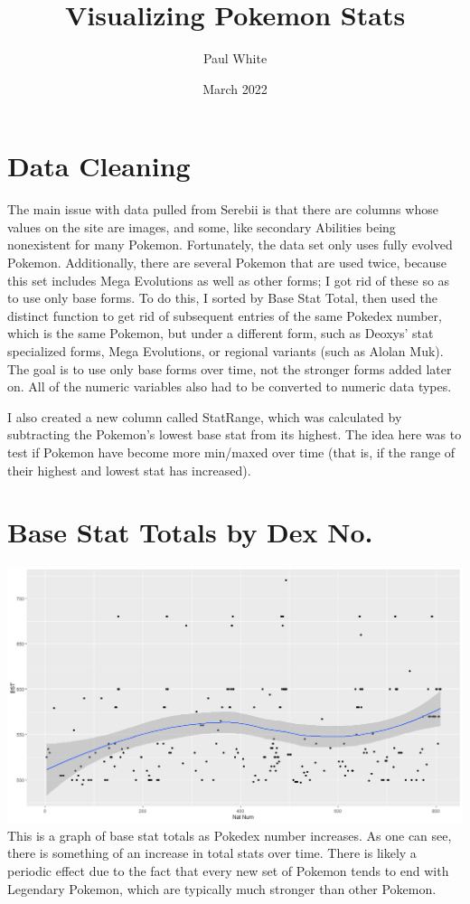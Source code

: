 \documentclass{article}
\title{Visualizing Pokemon Stats}
\author{Paul White}
\date{March 2022}
\begin{document}
\maketitle

\section{Data Cleaning}
The main issue with data pulled from Serebii is that there are columns whose values on the site are images, and some, like secondary Abilities being nonexistent for many Pokemon. Fortunately, the data set only uses fully evolved Pokemon. Additionally, there are several Pokemon that are used twice, because this set includes Mega Evolutions as well as other forms; I got rid of these so as to use only base forms. To do this, I sorted by Base Stat Total, then used the distinct function to get rid of subsequent entries of the same Pokedex number, which is the same Pokemon, but under a different form, such as Deoxys' stat specialized forms, Mega Evolutions, or regional variants (such as Alolan Muk). The goal is to use only base forms over time, not the stronger forms added later on. All of the numeric variables also had to be converted to numeric data types.

I also created a new column called StatRange, which was calculated by subtracting the Pokemon's lowest base stat from its highest. The idea here was to test if Pokemon have become more min/maxed over time (that is, if the range of their highest and lowest stat has increased).

\section{Base Stat Totals by Dex No.}

\includegraphics[scale = .4]{PS6a_White.png}
This is a graph of base stat totals as Pokedex number increases. As one can see, there is something of an increase in total stats over time. There is likely a periodic effect due to the fact that every new set of Pokemon tends to end with Legendary Pokemon, which are typically much stronger than other Pokemon.
\end{document}
